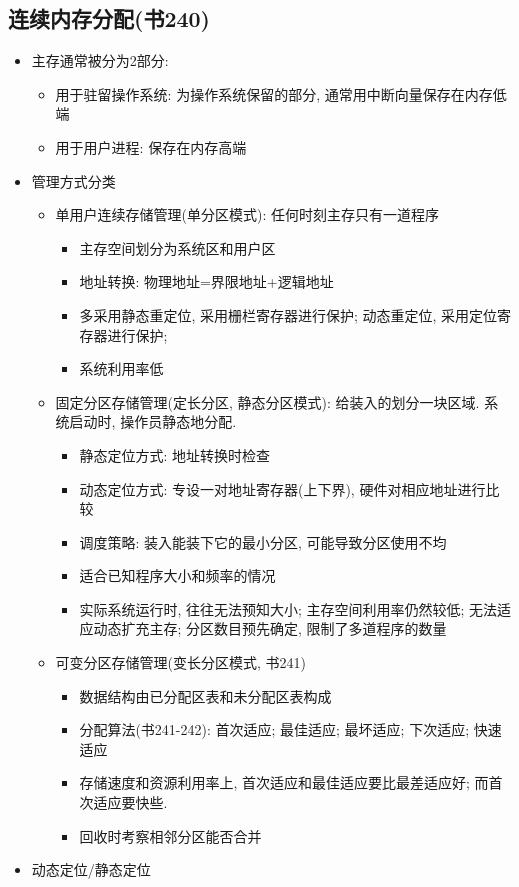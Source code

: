 \documentclass[a4paper, UTF8]{article}
\begin{document}
\subsection{连续内存分配(书240)}
\begin{itemize}
\item 主存通常被分为2部分:
	\begin{itemize}
	\item 用于驻留操作系统: 为操作系统保留的部分, 通常用中断向量保存在内存低端
	\item 用于用户进程: 保存在内存高端
	\end{itemize}
\item 管理方式分类
	\begin{itemize}
	\item 单用户连续存储管理(单分区模式): 任何时刻主存只有一道程序
		\begin{itemize}
		\item 主存空间划分为系统区和用户区
		\item 地址转换: 物理地址=界限地址+逻辑地址
		\item 多采用静态重定位, 采用栅栏寄存器进行保护; 动态重定位, 采用定位寄存器进行保护;
		\item 系统利用率低
		\end{itemize}
	\item 固定分区存储管理(定长分区, 静态分区模式): 给装入的划分一块区域. 系统启动时, 操作员静态地分配.
		\begin{itemize}
		\item 静态定位方式: 地址转换时检查
		\item 动态定位方式: 专设一对地址寄存器(上下界), 硬件对相应地址进行比较
		\item 调度策略: 装入能装下它的最小分区, 可能导致分区使用不均
		\item 适合已知程序大小和频率的情况
		\item 实际系统运行时, 往往无法预知大小; 主存空间利用率仍然较低; 无法适应动态扩充主存; 分区数目预先确定, 限制了多道程序的数量
		\end{itemize}
	\item 可变分区存储管理(变长分区模式, 书241)
		\begin{itemize}
		\item 数据结构由已分配区表和未分配区表构成
		\item 分配算法(书241-242): 首次适应; 最佳适应; 最坏适应; 下次适应; 快速适应
		\item 存储速度和资源利用率上, 首次适应和最佳适应要比最差适应好; 而首次适应要快些.
		\item 回收时考察相邻分区能否合并
		\end{itemize}
	\end{itemize}
\item 动态定位/静态定位
\end{itemize}
\end{document}
